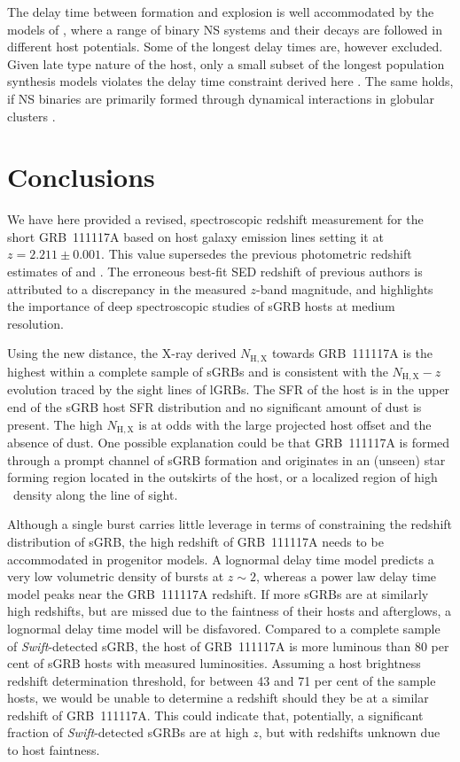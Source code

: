 \documentclass[referee]{aa}
\newcommand{\hi}{\ion{H}{i}}
\begin{document}
The delay time between formation and explosion is well accommodated by the
models of \citet{Belczynski2006}, where a range of binary NS systems and their
decays are followed in different host potentials.  Some of the longest delay
times are, however excluded. Given late type nature of the host, only a small
subset of the longest population synthesis models violates the delay time
constraint derived here \citep{OShaughnessy2008}. The same holds, if NS binaries
are primarily formed through dynamical interactions in globular clusters
\citep{Lee2010, Church2011}.

\section{Conclusions}

We have here provided a revised, spectroscopic redshift measurement for the
short GRB~111117A based on host galaxy emission lines setting it at $z = 2.211
\pm 0.001$. This value supersedes the previous photometric redshift estimates of
\citet{Margutti2012} and \citet{Sakamoto2013}. The erroneous best-fit SED
redshift of previous authors is attributed to a discrepancy in the measured
$z$-band magnitude, and highlights the importance of deep spectroscopic studies
of sGRB hosts at medium resolution.

Using the new distance, the X-ray derived $N_\mathrm{H,X}$ towards GRB~111117A
is the highest within a complete sample of sGRBs and is consistent with the
$N_\mathrm{H,X}-z$ evolution traced by the sight lines of lGRBs. The SFR of the
host is in the upper end of the sGRB host SFR distribution and no significant
amount of dust is present. The high $N_\mathrm{H,X}$ is at odds with the large
projected host offset and the absence of dust. One possible explanation could be
that GRB~111117A is formed through a prompt channel of sGRB formation and
originates in an (unseen) star forming region located in the outskirts of the
host, or a localized region of high \hi~density along the line of sight.

Although a single burst carries little leverage in terms of constraining the
redshift distribution of sGRB, the high redshift of GRB~111117A needs to be
accommodated in progenitor models. A lognormal delay time model predicts a very
low volumetric density of bursts at $z \sim 2$, whereas a power law delay time
model peaks near the GRB~111117A redshift. If more sGRBs are at similarly high
redshifts, but are missed due to the faintness of their hosts and afterglows, a
lognormal delay time model will be disfavored. Compared to a complete sample of
\textit{Swift}-detected sGRB, the host of GRB~111117A is more luminous than 80
per cent of sGRB hosts with measured luminosities. Assuming a host brightness
redshift determination threshold, for between 43 and 71 per cent of the sample
hosts, we would be unable to determine a redshift should they be at a similar
redshift of GRB~111117A. This could indicate that, potentially, a significant
fraction of \textit{Swift}-detected sGRBs are at high $z$, but with redshifts
unknown due to host faintness.
\end{document}
